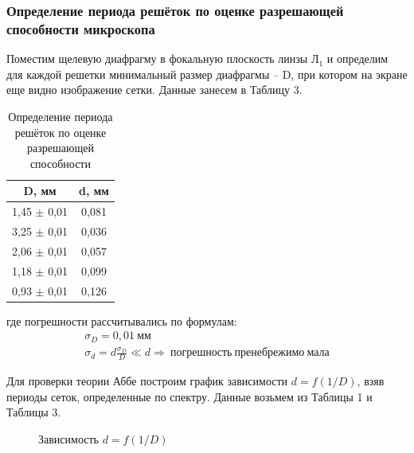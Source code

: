 \documentclass[a4paper,12pt]{article}
\begin{document}
\subsubsection*{Определение периода решёток по оценке разрешающей способности микроскопа}

Поместим щелевую диафрагму в фокальную плоскость линзы $Л_1$ и определим для каждой решетки минимальный размер диафрагмы -- D, при котором на экране еще видно изображение сетки. Данные занесем в Таблицу 3.

\begin{table}[h]
\begin{center}
\caption{Определение периода решёток по оценке разрешающей способности }
\label{table:sposob}
\begin{tabular}{|c|c|}
\hline
\textbf{D, мм} & \textbf{d, мм} \\ \hline
1,45 $\pm$	0,01   & 0,081          \\ \hline
3,25 $\pm$	0,01   & 0,036          \\ \hline
2,06 $\pm$	0,01   & 0,057          \\ \hline
1,18 $\pm$	0,01   & 0,099          \\ \hline
0,93 $\pm$	0,01   & 0,126          \\ \hline
\end{tabular}
\end{center}
\end{table}

где погрешности рассчитывались по формулам:
\begin{gather*}
\sigma_{D} = 0,01 \ мм \\
%
\sigma_{d} = d \frac{\sigma_{D}}{D} \ll d \Rightarrow \ погрешность \ пренебрежимо \ мала
\end{gather*}

\newpage

Для проверки теории Аббе построим график зависимости $d = f(1/D)$, взяв периоды сеток, определенные по спектру. Данные возьмем из Таблицы 1 и Таблицы 3.

	\begin{figure}[h]
		\caption{Зависимость $d = f(1/D)$ }
		\label{fig:graph1}
	\end{figure}  
\end{document}
